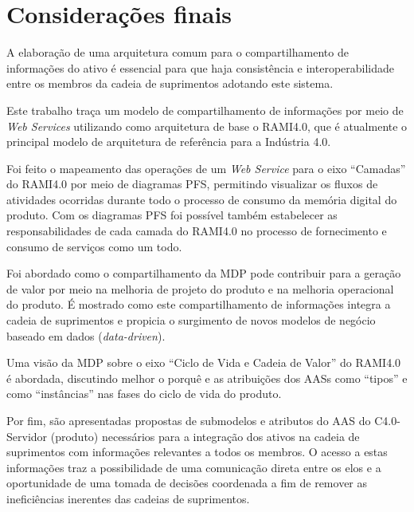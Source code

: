 \chapter{Considerações finais}
\label{cha:conclusao}

A elaboração de uma arquitetura comum para o compartilhamento de informações do ativo é essencial para que haja consistência e interoperabilidade entre os membros da cadeia de suprimentos adotando este sistema.

Este trabalho traça um modelo de compartilhamento de informações por meio de \textit{Web Services} utilizando como arquitetura de base o RAMI4.0, que é atualmente o principal modelo de arquitetura de referência para a Indústria 4.0.

Foi feito o mapeamento das operações de um \textit{Web Service} para o eixo ``Camadas'' do RAMI4.0 por meio de diagramas PFS, permitindo visualizar os fluxos de atividades ocorridas durante todo o processo de consumo da memória digital do produto. Com os diagramas PFS foi possível também estabelecer as responsabilidades de cada camada do RAMI4.0 no processo de fornecimento e consumo de serviços como um todo.

Foi abordado como o compartilhamento da MDP pode contribuir para a geração de valor por meio na melhoria de projeto do produto e na melhoria operacional do produto. É mostrado como este compartilhamento de informações integra a cadeia de suprimentos e propicia o surgimento de novos modelos de negócio baseado em dados (\textit{data-driven}).

Uma visão da MDP sobre o eixo ``Ciclo de Vida e Cadeia de Valor'' do RAMI4.0 é abordada, discutindo melhor o porquê e as atribuições dos AASs como ``tipos'' e como ``instâncias'' nas fases do ciclo de vida do produto.

Por fim, são apresentadas propostas de submodelos e atributos do AAS do C4.0-Servidor (produto) necessários para a integração dos ativos na cadeia de suprimentos com informações relevantes a todos os membros. O acesso a estas informações traz a possibilidade de uma comunicação direta entre os elos e a oportunidade de uma tomada de decisões coordenada a fim de remover as ineficiências inerentes das cadeias de suprimentos.
